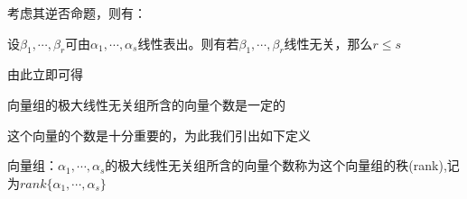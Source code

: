 考虑其逆否命题，则有：
\begin{corollary}
    设$\beta_1, \cdots, \beta_r$可由$\alpha_1, \cdots, \alpha_s$线性表出。则有若$\beta_1, \cdots, \beta_r$线性无关，那么$r \leq s$
\end{corollary}

由此立即可得
\begin{theorem}
    向量组的极大线性无关组所含的向量个数是一定的
\end{theorem}

这个向量的个数是十分重要的，为此我们引出如下定义
\begin{definition}
    向量组：$\alpha_1, \cdots, \alpha_s$的极大线性无关组所含的向量个数称为这个向量组的秩(rank),记为$rank\{\alpha_1, \cdots, \alpha_s\}$    
\end{definition}
